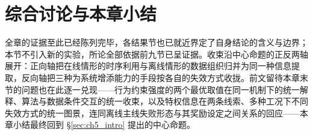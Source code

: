 
\section{综合讨论与本章小结}\label{sec:ch5_discussion}

全章的证据至此已经陈列完毕，各结果节也已就近界定了自身结论的含义与边界；本节不引入新的实验，所论全部依据前九节已呈证据。收束沿中心命题的正反两轴展开：正向轴把在线情形的时序利用与离线情形的数据组织归并为同一种信息提取，反向轴把三种为系统增添能力的手段按各自的失效方式收拢。前文留待本章末节的问题也在此逐一兑现——行为约束强度的两个最优取值在同一机制下的统一解释、算法与数据条件交互的统一收束，以及特权信息在两条线索、多种工况下不同失效方式的统一图景，连同离线主线失败形态与其奖励设定之间关系的回应——本章小结最终回到 \S\ref{sec:ch5_intro} 提出的中心命题。

